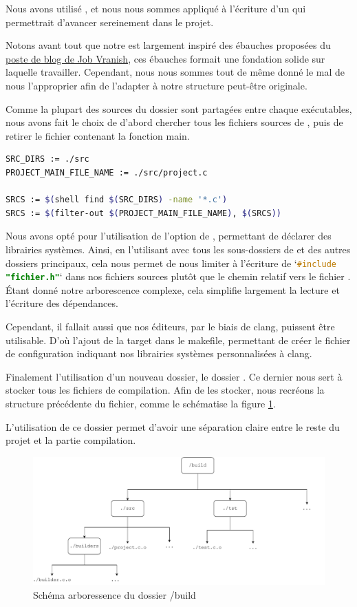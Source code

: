     Nous avons utilisé , et nous nous sommes appliqué à l'écriture d'un  qui
permettrait d'avancer sereinement dans le projet.

    Notons avant tout que notre  est largement inspiré des ébauches proposées du \href{https://spin.atomicobject.com/makefile-c-projects/}{poste de blog de Job Vranish}, 
ces ébauches formait une fondation solide sur laquelle travailler. Cependant, nous nous sommes tout de même donné le mal de nous l'approprier
afin de l'adapter à notre structure peut-être originale.

    Comme la plupart des sources du dossier  sont partagées entre chaque exécutables, nous avons fait le choix de
d'abord chercher tous les fichiers sources de , puis de retirer le fichier  contenant la fonction main.

\begin{lstlisting}[frame=single, language=sh, caption={Filtrage des fichiers sources du jeu}]
SRC_DIRS := ./src
PROJECT_MAIN_FILE_NAME := ./src/project.c

SRCS := $(shell find $(SRC_DIRS) -name '*.c')
SRCS := $(filter-out $(PROJECT_MAIN_FILE_NAME), $(SRCS))
\end{lstlisting}

    Nous avons opté pour l'utilisation de l'option  de , permettant de déclarer des librairies systèmes. Ainsi, en 
l'utilisant avec tous les sous-dossiers de  et des autres dossiers principaux, cela nous permet de nous limiter à l'écriture de `\lstinline[language=C]{#include "fichier.h"}` dans nos fichiers sources plutôt que le chemin relatif vers le fichier . Étant donné notre arborescence complexe, cela simplifie largement la lecture et l'écriture des dépendances.

    Cependant, il fallait aussi que nos éditeurs, par le biais de clang, puissent être utilisable. D'où l'ajout de la target  dans
le makefile, permettant de créer le fichier de configuration  indiquant nos librairies systèmes personnalisées à clang.

Finalement l'utilisation d'un nouveau dossier, le dossier . Ce dernier nous sert à stocker tous les fichiers de compilation. Afin de les stocker, nous recréons la structure précédente du fichier, comme le schématise la figure \ref{fig:build_dir}. 

    L'utilisation de ce dossier permet d'avoir une séparation claire entre le reste du projet et la partie compilation.

\begin{center}
    \begin{figure}[H]
        \centering
        \includegraphics[width=.8\textwidth]{img/build_dir.pdf}
        \caption{Schéma arboressence du dossier /build}
        \label{fig:build_dir}
    \end{figure}
\end{center}


